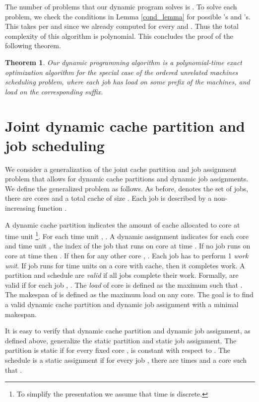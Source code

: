 \documentclass[11pt]{article}
\newtheorem{theorem}{Theorem}[section]
\begin{document}
The number of problems  that our dynamic program solves is .
To solve each problem, we check the conditions in Lemma \ref{cond_lemma} for  possible 's and 's. This takes  per  and  since we already computed  for every  and . Thus the total complexity of this algorithm is polynomial. This concludes the proof of the following theorem.

\begin{theorem}
Our dynamic programming algorithm is a polynomial-time exact optimization algorithm for the special case of the ordered unrelated machines scheduling problem, where each job  has load  on some prefix of the machines, and load  on the corresponding suffix.
\end{theorem}

\section{Joint dynamic cache partition and job scheduling}\label{sec_variants}

We consider a generalization of the joint cache partition and job assignment problem that allows for dynamic cache partitions and dynamic job assignments.
We define the generalized problem as follows.
As before,  denotes the set of jobs, there are  cores and a total cache of size .
Each job  is described by a non-increasing function .

A dynamic cache partition  indicates the amount of cache allocated to core  at time unit \footnote{To simplify the presentation we assume that time is discrete.}.
For each time unit , .
A dynamic assignment  indicates for each core  and time unit , the index of the job that runs on core  at time . If no job runs on core  at time  then . If  then for any other core , .
Each job has to perform 1 \textit{work unit}. If job  runs for  time units on a core with  cache, then it completes  work. A partition and schedule  are \textit{valid} if all jobs complete their work.
Formally,  are valid if for each job , .
The \textit{load} of core  is defined as the maximum  such that .
The makespan of  is defined as the maximum load on any core. The goal is to find a valid dynamic cache partition and dynamic job assignment with a minimal makespan.

It is easy to verify that dynamic cache partition and dynamic job assignment, as defined above, generalize  the static partition and static job assignment.
The partition is static if for every fixed core ,  is constant with respect to .
The schedule is a static assignment if for every job , there are times  and a core  such that .
\end{document}
